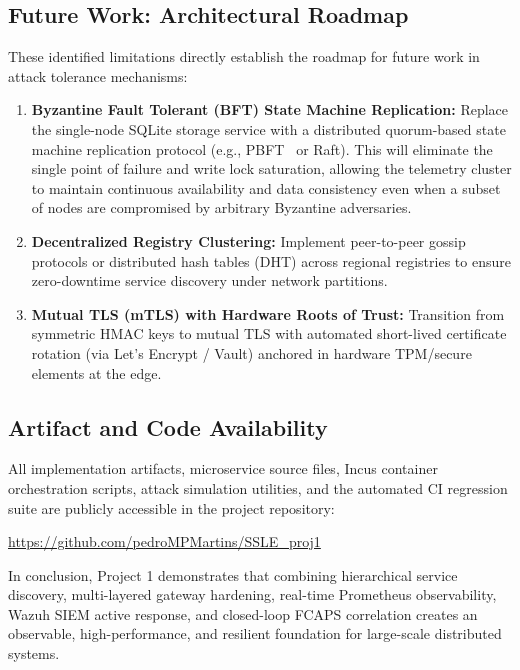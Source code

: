 \subsection{Future Work: Architectural Roadmap}
These identified limitations directly establish the roadmap for future work in attack tolerance mechanisms:
\begin{enumerate}
    \item \textbf{Byzantine Fault Tolerant (BFT) State Machine Replication:} Replace the single-node SQLite storage service with a distributed quorum-based state machine replication protocol (e.g., PBFT~\citep{castro2002practical} or Raft). This will eliminate the single point of failure and write lock saturation, allowing the telemetry cluster to maintain continuous availability and data consistency even when a subset of nodes are compromised by arbitrary Byzantine adversaries.
    \item \textbf{Decentralized Registry Clustering:} Implement peer-to-peer gossip protocols or distributed hash tables (DHT) across regional registries to ensure zero-downtime service discovery under network partitions.
    \item \textbf{Mutual TLS (mTLS) with Hardware Roots of Trust:} Transition from symmetric HMAC keys to mutual TLS with automated short-lived certificate rotation (via Let's Encrypt / Vault) anchored in hardware TPM/secure elements at the edge.
\end{enumerate}

\subsection{Artifact and Code Availability}
All implementation artifacts, microservice source files, Incus container orchestration scripts, attack simulation utilities, and the automated CI regression suite are publicly accessible in the project repository:
\begin{center}
\url{https://github.com/pedroMPMartins/SSLE_proj1}
\end{center}

In conclusion, Project 1 demonstrates that combining hierarchical service discovery, multi-layered gateway hardening, real-time Prometheus observability, Wazuh SIEM active response, and closed-loop FCAPS correlation creates an observable, high-performance, and resilient foundation for large-scale distributed systems.
